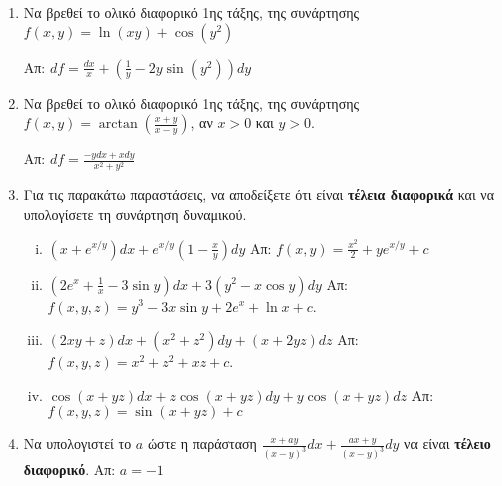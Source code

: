 \begin{enumerate}

  \item Να βρεθεί το ολικό διαφορικό 1ης τάξης, της συνάρτησης 
    $f(x,y)=\ln(xy)+\cos(y^2)$ 

    \hfill Απ: $df=\frac{dx}{x}+\left(\frac{1}{y}-2y\sin(y^2)\right)dy$

  \item Να βρεθεί το ολικό διαφορικό 1ης τάξης, της συνάρτησης 
    $ f(x,y) = \arctan(\frac{ x+y }{ x-y }) $, αν $ x>0 $ και $ y>0 $.

    \hfill Απ: $df = \frac{ -ydx + xdy }{ x^{2} + y^{2} } $ 



  \item Για τις παρακάτω παραστάσεις, να αποδείξετε ότι είναι \textbf{τέλεια
    διαφορικά} και να υπολογίσετε τη συνάρτηση δυναμικού.
    \begin{enumerate}[i)]
      \item $ \left(x+e^{x/y}\right)dx + e^{x/y}\left(1- \frac{x}{y}\right)dy $
        \hfill Απ: $ f(x,y) = \frac{x^{2}}{2} +y e^{x/y} + c $ 

      \item $\left(2e^{x}+\frac{1}{x}-3\sin y\right)dx+3(y^2-x\cos y)dy$ 
        \hfill  Απ: $ f(x,y,z) = y^{3}-3x \sin{y} + 2e^{x} + \ln{x} +c $.

      \item $(2xy+z)dx+(x^{2}+z^{2})dy+(x+2yz)dz$ 
        \hfill  Απ: $ f(x,y,z) = x^{2}+z^{2}+xz +c $.


      \item $ \cos(x+yz)dx + z\cos(x+yz)dy+y\cos(x+yz)dz $
        \hfill Απ: $ f(x,y,z) = \sin(x+yz) + c $
    \end{enumerate}

  \item Να υπολογιστεί το $a$ ώστε η παράσταση $ \frac{ x + ay }{ (x-y)^{3} }dx 
    + \frac{ ax+y }{ (x-y)^{3} }dy $ να είναι \textbf{τέλειο διαφορικό}.
    \hfill Απ: $ a=-1 $


\end{enumerate}
